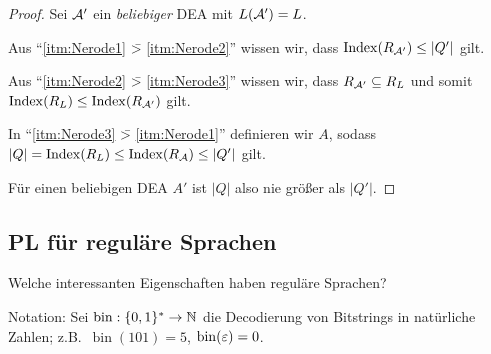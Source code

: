 \begin{proof}
        Sei $\mathcal{A}'$ ein \emph{beliebiger} \ac{DEA} mit $L(\mathcal{A}')=L$.
        
        Aus "`\ref{itm:Nerode1} {\=>} \ref{itm:Nerode2}"' wissen wir, dass $\operatorname{Index}(R_{\mathcal{A}'})\leq |Q'|$ gilt.
        
        Aus "`\ref{itm:Nerode2} \=> \ref{itm:Nerode3}"' wissen wir, dass $R_{\mathcal{A}'}\subseteq R_L$ und somit $\operatorname{Index}(R_L) \leq \operatorname{Index}(R_{\mathcal{A}'})$ gilt.
        
        In "`\ref{itm:Nerode3} \=> \ref{itm:Nerode1}"' definieren wir $A$, sodass $|Q|=\operatorname{Index}(R_L) \leq \operatorname{Index}(R_{\mathcal{A}})\leq |Q'|$ gilt.
        
        Für einen beliebigen \acs*{DEA} $A'$ ist $|Q|$ also nie größer als $|Q'|$.
\end{proof}


\subsection{\acf{PL} für reguläre Sprachen} %
Welche interessanten Eigenschaften haben reguläre Sprachen?

Notation: Sei $\operatorname{bin}:\{0,1\}^*\rightarrow \mathbb{N}$ die Decodierung von Bitstrings in natürliche Zahlen;
z.B.\ $\operatorname{bin}(101) = 5$, $\operatorname{bin}(\varepsilon) = 0$.

